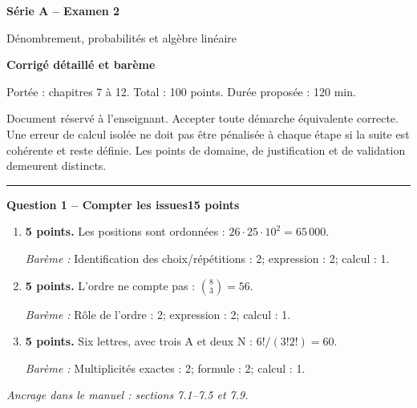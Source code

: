 \documentclass[11pt,a4paper]{article}
\begin{document}
{\LARGE\bfseries Série A -- Examen 2}\par
{\large Dénombrement, probabilités et algèbre linéaire}\par
\textbf{Corrigé détaillé et barème}\par
Portée : chapitres 7 à 12. Total : 100 points. Durée proposée : 120 min.\par
\small Document réservé à l’enseignant. Accepter toute démarche équivalente correcte. Une erreur de calcul isolée ne doit pas être pénalisée à chaque étape si la suite est cohérente et reste définie. Les points de domaine, de justification et de validation demeurent distincts.\normalsize\par
\vspace{3mm}\hrule\vspace{4mm}
{\large\bfseries Question 1 -- Compter les issues}\hfill\textbf{15 points}\par
\begin{enumerate}
\item \textbf{5 points.} Les positions sont ordonnées : \(26\cdot25\cdot10^2=65\,000\).
\par{\small\textit{Barème : }Identification des choix/répétitions : 2; expression : 2; calcul : 1.}
\item \textbf{5 points.} L’ordre ne compte pas : \(\binom83=56\).
\par{\small\textit{Barème : }Rôle de l’ordre : 2; expression : 2; calcul : 1.}
\item \textbf{5 points.} Six lettres, avec trois A et deux N : \(6!/(3!2!)=60\).
\par{\small\textit{Barème : }Multiplicités exactes : 2; formule : 2; calcul : 1.}
\end{enumerate}
\vfill {\small\textit{Ancrage dans le manuel : sections 7.1--7.5 et 7.9.}}
\end{document}
